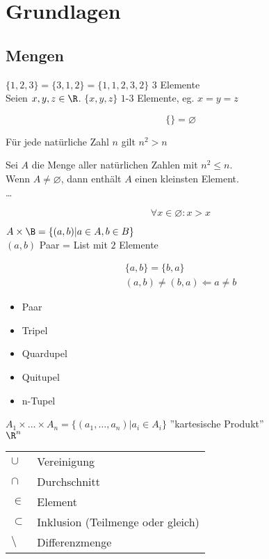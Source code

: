 \chapter{Grundlagen}
\section{Mengen}
\begin{bsp*}
	$\{1,2,3\} = \{3,1,2\} = \{1,1,2,3,2\}$ \qquad $3$ Elemente\\
	Seien $x, y, z \in \R$. $\{x,y,z\}$ \qquad $1$-$3$ Elemente, eg. $x = y = z$
\end{bsp*}

\[ \{\} = \varnothing \]

\begin{bsp*}
	Für jede natürliche Zahl $n$ gilt $n^2 > n$\\
	\begin{bew}
		Sei $A$ die Menge aller natürlichen Zahlen mit $n^2 \leq n$.\\
		Wenn $A \neq \varnothing$, dann enthält $A$ einen kleinsten Element.\\
		\dots
	\end{bew}
\end{bsp*}

\[ \forall x \in \varnothing : x > x \]

$A \times \B = \{ (a,b) | a \in A, b \in B \}$\\
$(a,b)$ Paar = List mit $2$ Elemente

\begin{gather*}
	\{a,b\} = \{b,a\} \\
	(a,b) \neq (b,a) \Leftarrow a \neq b
\end{gather*}

\begin{itemize}
	\item Paar
	\item Tripel
	\item Quardupel
	\item Quitupel
	\item n-Tupel
\end{itemize}

$A_1 \times \dots \times A_n = \{ (a_1 , \dotsc , a_n ) | a_i \in A_i \}$ ''kartesische Produkt''\\
$\R^n$\\

\begin{tabular}{ll}
	$\cup$		&Vereinigung					\\
	$\cap$		&Durchschnitt					\\
	$\in$			&Element						\\
	$\subset$		&Inklusion (Teilmenge oder gleich)	\\
	$\setminus$	&Differenzmenge				
\end{tabular}

